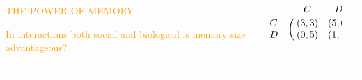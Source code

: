 \documentclass[usenames,dvipsnames,t]{beamer}
\begin{document}
\begin{columns}
    \begin{column}{.50\linewidth}
    \vspace{1cm}

    \centering
    \textcolor{orange}{\fontsize{100}{110} \selectfont THE POWER OF MEMORY}
    \vspace{0.5cm}

    \Large\textcolor{orange}{In interactions both social and biological is memory
    size advantageous?}
    \end{column}
    \begin{column}{.2\linewidth}
    
        \Large{
        \begin{equation*}\label{eq:payoff_matrix}
             \bordermatrix{     & C & D \cr
                              C ~~ & (3, 3) & (5, 0) \cr
                              D ~~ & (0, 5) & (1, 1) \cr}
            \end{equation*}}
        \end{column}
    \begin{column}{.3\linewidth}
        \begin{center}
            
        \end{center}
    \end{column}
\end{columns}
\vspace{0.7cm}

\hrule height 5pt

\end{document}
